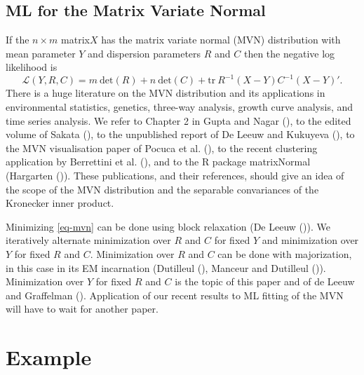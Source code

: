 \documentclass[
  12pt,
  letterpaper,
  DIV=11,
  numbers=noendperiod]{scrartcl}
\newcommand{\sectionbreak}{\clearpage}
\begin{document}
\subsection{ML for the Matrix Variate
Normal}\label{ml-for-the-matrix-variate-normal}

If the \(n\times m\) matrix\(X\) has the matrix variate normal (MVN)
distribution with mean parameter \(Y\) and dispersion parameters \(R\)
and \(C\) then the negative log likelihood is \begin{equation}
\mathcal{L}(Y,R,C)=m\ \text{det}(R)+n\ \text{det}(C)+\text{tr}\ R^{-1}(X-Y)C^{-1}(X-Y)'.\label{eq-mvn}
\end{equation} There is a huge literature on the MVN distribution and
its applications in environmental statistics, genetics, three-way
analysis, growth curve analysis, and time series analysis. We refer to
Chapter 2 in Gupta and Nagar (), to
the edited volume of Sakata (), to the
unpublished report of De Leeuw and Kukuyeva
(), to the MVN visualisation
paper of Pocuca et al.
(), to the
recent clustering application by Berrettini et al.
(), and to the R
package matrixNormal (Hargarten ()).
These publications, and their references, should give an idea of the
scope of the MVN distribution and the separable convariances of the
Kronecker inner product.

Minimizing \eqref{eq-mvn} can be done using block relaxation (De Leeuw
()). We iteratively alternate
minimization over \(R\) and \(C\) for fixed \(Y\) and minimization over
\(Y\) for fixed \(R\) and \(C\). Minimization over \(R\) and \(C\) can
be done with majorization, in this case in its EM incarnation (Dutilleul
(), Manceur and Dutilleul
()). Minimization over \(Y\)
for fixed \(R\) and \(C\) is the topic of this paper and of {de Leeuw
and Graffelman} ().
Application of our recent results to ML fitting of the MVN will have to
wait for another paper.

\sectionbreak

\section{Example}\label{example}
\end{document}
